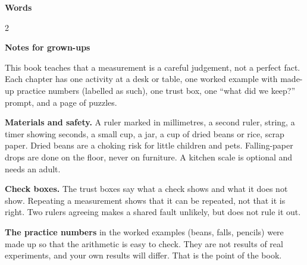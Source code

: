 \clearpage\label{notes}
{\sans\bfseries\LARGE\color{ink} Words}\par
\small
\begin{multicols}{2}
\end{multicols}

\vspace{0.4em}
{\sans\bfseries\large\color{sky!70!black} Notes for grown-ups}\par
This book teaches that a measurement is a careful judgement, not a perfect fact. Each chapter has one activity at a desk or table, one worked example with made-up practice numbers (labelled as such), one trust box, one ``what did we keep?'' prompt, and a page of puzzles.

\textbf{Materials and safety.} A ruler marked in millimetres, a second ruler, string, a timer showing seconds, a small cup, a jar, a cup of dried beans or rice, scrap paper. Dried beans are a choking risk for little children and pets. Falling-paper drops are done on the floor, never on furniture. A kitchen scale is optional and needs an adult.

\textbf{Check boxes.} The trust boxes say what a check shows and what it does not show. Repeating a measurement shows that it can be repeated, not that it is right. Two rulers agreeing makes a shared fault unlikely, but does not rule it out.

\textbf{The practice numbers} in the worked examples (beans, falls, pencils) were made up so that the arithmetic is easy to check. They are not results of real experiments, and your own results will differ. That is the point of the book.

